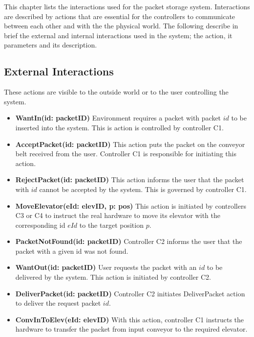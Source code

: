 \label{sec:ext_interactions}
This chapter lists the interactions used for the packet storage system. Interactions are described by actions that are essential for the controllers to communicate between each other and with the the physical world. The following describe in brief the external and internal interactions used in the system; the action, it parameters and its description.

\subsection*{External Interactions} These actions are visible to the outside world or to the user controlling the system.

\begin{itemize}
\item \textbf{WantIn(id: packetID)}
Environment requires a packet with packet $id$ to be inserted into the system. This is action is controlled by controller C1.

\item \textbf{AcceptPacket(id: packetID)}
This action puts the packet on the conveyor belt received from the user. Controller C1 is responsible for initiating this action.

\item \textbf{RejectPacket(id: packetID)}
This action informs the user that the packet with $id$ cannot be accepted by the system. This is governed by controller C1.

\item \textbf{MoveElevator(eId: elevID, p: pos)}
This action is initiated by controllers C3 or C4 to instruct the real hardware to move its elevator with the corresponding id $eId$ to the target position $p$.

\item \textbf{PacketNotFound(id: packetID)}
Controller C2 informs the user that the packet with a given id was not found.

\item \textbf{WantOut(id: packetID)}
User requests the packet with an $id$ to be delivered by the system. This action is initiated by controller C2.

\item \textbf{DeliverPacket(id: packetID)}
Controller C2 initiates DeliverPacket action to deliver the request packet $id$.

\item \textbf{ConvInToElev(eId: elevID)}
With this action, controller C1 instructs the hardware to transfer the packet from input conveyor to the required elevator.


\end{itemize}
